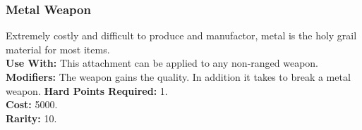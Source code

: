 \subsubsection{Metal Weapon}
Extremely costly and difficult to produce and manufactor, metal is the holy grail
material for most items.\\
\textbf{Use With:} This attachment can be applied to any non-ranged weapon.\\
\textbf{Modifiers:}
    The weapon gains the  quality.
    In addition it takes \despair\despair to break a metal weapon.
\textbf{Hard Points Required:} 1.\\
\textbf{Cost:} 5000.\\
\textbf{Rarity:} 10.\\
